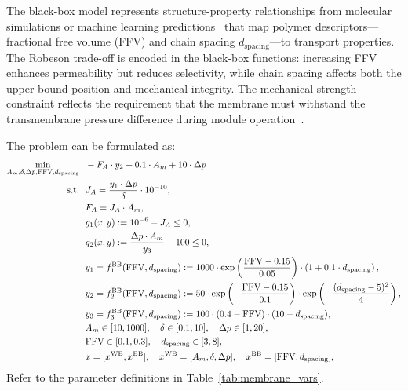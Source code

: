 \documentclass[12pt,a4paper]{article}%
\theoremstyle{plain}%
\theoremstyle{remark}%
\theoremstyle{definition}%
\def\WB{\mathrm{WB}}
\def\BB{\mathrm{BB}}
\begin{document}
\begin{appendices}
The black-box model represents structure-property relationships from molecular simulations or machine learning predictions~\cite{barnett2020designing} that map polymer descriptors---fractional free volume (FFV) and chain spacing $d_{\text{spacing}}$---to transport properties. The Robeson trade-off is encoded in the black-box functions: increasing FFV enhances permeability but reduces selectivity, while chain spacing affects both the upper bound position and mechanical integrity. The mechanical strength constraint reflects the requirement that the membrane must withstand the transmembrane pressure difference during module operation~\cite{park2017maximizing}.

The problem can be formulated as:
\begin{align} \label{eq:Membrane}
    \min_{A_m, \delta, \Delta p, \text{FFV}, d_{\text{spacing}}} &~~ -F_A \cdot y_2 + 0.1 \cdot A_m + 10 \cdot \Delta p \\\notag
    \text{s.t.} &~~ J_A = \frac{y_1 \cdot \Delta p}{\delta} \cdot 10^{-10}, \\\notag
    &~~ F_A = J_A \cdot A_m, \\\notag
    &~~ g_1(x, y) := 10^{-6} - J_A \leq 0, \\\notag
    &~~ g_2(x, y) := \frac{\Delta p \cdot A_m}{y_3} - 100 \leq 0, \\\notag
    &~~ y_1 = f^\BB_1(\text{FFV}, d_{\text{spacing}}) := 1000 \cdot \exp\left(\frac{\text{FFV} - 0.15}{0.05}\right) \cdot \left(1 + 0.1 \cdot d_{\text{spacing}}\right), \\\notag
    &~~ y_2 = f^\BB_2(\text{FFV}, d_{\text{spacing}}) := 50 \cdot \exp\left(-\frac{\text{FFV} - 0.15}{0.1}\right) \cdot \exp\left(-\frac{(d_{\text{spacing}} - 5)^2}{4}\right), \\\notag
    &~~ y_3 = f^\BB_3(\text{FFV}, d_{\text{spacing}}) := 100 \cdot (0.4 - \text{FFV}) \cdot (10 - d_{\text{spacing}}), \\\notag
    &~~ A_m \in [10, 1000], \quad \delta \in [0.1, 10], \quad \Delta p \in [1, 20], \\\notag
    &~~ \text{FFV} \in [0.1, 0.3], \quad d_{\text{spacing}} \in [3, 8], \\\notag
    &~~ x = [x^{\WB}, x^{\BB}], \quad x^{\WB} = [A_m, \delta, \Delta p], \quad x^{\BB} = [\text{FFV}, d_{\text{spacing}}],
\end{align}
Refer to the parameter definitions in Table~\ref{tab:membrane_vars}.


\end{appendices}
\end{document}
